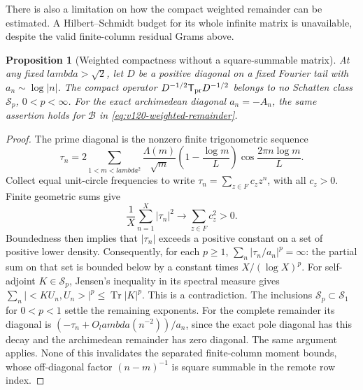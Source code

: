 \documentclass[11pt]{article}
\def\lambda{lambda}%
\def\ip#1#2{<#1,#2>}%
\newtheorem{proposition}[theorem]{Proposition}
\theoremstyle{remark}
\newcommand{\ip}[2]{\left\langle #1,#2\right\rangle}
\begin{document}
There is also a limitation on how the compact weighted remainder can
be estimated. A Hilbert--Schmidt budget for its whole infinite matrix
is unavailable, despite the valid finite-column residual Grams above.

\begin{proposition}[Weighted compactness without a square-summable matrix]
\label{prop:v120-not-schatten}
At any fixed $\lambda>\sqrt2$, let $D$ be a positive diagonal on a
fixed Fourier tail with $a_n\sim\log|n|$. The compact operator
$D^{-1/2}\mathsf T_{\rm pr}D^{-1/2}$ belongs to no Schatten class
$\mathcal S_p$, $0<p<\infty$. For the exact archimedean diagonal
$a_n=-A_n$, the same assertion holds for
$\mathcal B$ in \eqref{eq:v120-weighted-remainder}.
\end{proposition}
\begin{proof}
The prime diagonal is the nonzero finite trigonometric sequence
\[
 \tau_n=2\sum_{1<m<\lambda^2}
 \frac{\Lambda(m)}{\sqrt m}
 \left(1-\frac{\log m}{L}\right)
 \cos\frac{2\pi n\log m}{L}.
\]
Collect equal unit-circle frequencies to write
$\tau_n=\sum_{z\in F}c_z z^n$, with all $c_z>0$.
Finite geometric sums give
\[
 \frac1X\sum_{n=1}^X|\tau_n|^2\longrightarrow
 \sum_{z\in F}c_z^2>0.
\]
Boundedness then implies that $|\tau_n|$ exceeds a positive
constant on a set of positive lower density. Consequently, for each
$p\ge1$, $\sum_n|\tau_n/a_n|^p=\infty$: the partial sum on
that set is bounded below by a constant times $X/(\log X)^p$.
For self-adjoint $K\in\mathcal S_p$, Jensen's inequality in its
spectral measure gives
$\sum_n|\ip{KU_n}{U_n}|^p\le\operatorname{Tr}|K|^p$.
This is a contradiction. The inclusions
$\mathcal S_p\subset\mathcal S_1$ for $0<p<1$ settle the
remaining exponents. For the complete remainder its diagonal is
$(-\tau_n+O_\lambda(n^{-2}))/a_n$, since the exact pole diagonal
has this decay and the archimedean remainder has zero diagonal.
The same argument applies. None of this invalidates the separated
finite-column moment bounds, whose off-diagonal factor
$(n-m)^{-1}$ is square summable in the remote row index.
\end{proof}
\end{document}
